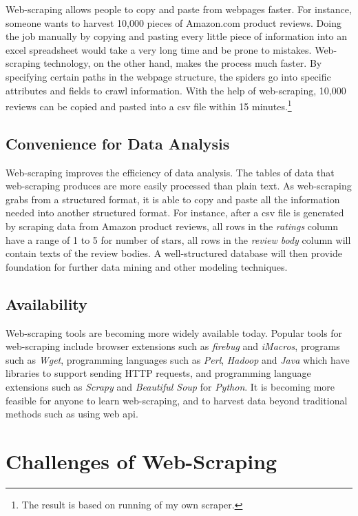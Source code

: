 \documentclass[12pt]{report}
\begin{document}
Web-scraping allows people to copy and paste from webpages faster. For instance, someone wants to harvest 10,000 pieces of Amazon.com product reviews. Doing the job manually by copying and pasting every little piece of information into an excel spreadsheet would take a very long time and be prone to mistakes. Web-scraping technology, on the other hand, makes the process much faster. By specifying certain paths in the webpage structure, the spiders go into specific attributes and fields to \gls{crawl} information. With the help of web-scraping, 10,000 reviews can be copied and pasted into a \gls{csv} file within 15 minutes.\footnote{The result is based on running of my own scraper.}

\subsection{Convenience for Data Analysis}

Web-scraping improves the efficiency of data analysis. The tables of data that web-scraping produces are more easily processed than plain text. As web-scraping grabs from a structured format, it is able to copy and paste all the information needed into another structured format. For instance, after a \gls{csv} file is generated by scraping data from Amazon product reviews, all rows in the \textit{ratings} column have a range of 1 to 5 for number of stars, all rows in the \textit{review body} column will contain texts of the review bodies. A well-structured database will then provide foundation for further data \gls{mining} and other modeling techniques.

\subsection{Availability}

Web-scraping tools are becoming more widely available today. Popular tools for web-scraping include browser extensions such as \textit{firebug} and \textit{iMacros}, programs such as \textit{Wget}, programming languages such as \textit{Perl}, \textit{Hadoop} and \textit{Java} which have libraries to support sending HTTP requests, and programming language extensions such as \textit{Scrapy} and \textit{Beautiful Soup} for \textit{Python}. It is becoming more feasible for anyone to learn web-scraping, and to \gls{harvest} data beyond traditional methods such as using web \gls{api}.

\section{Challenges of Web-Scraping}
\end{document}
